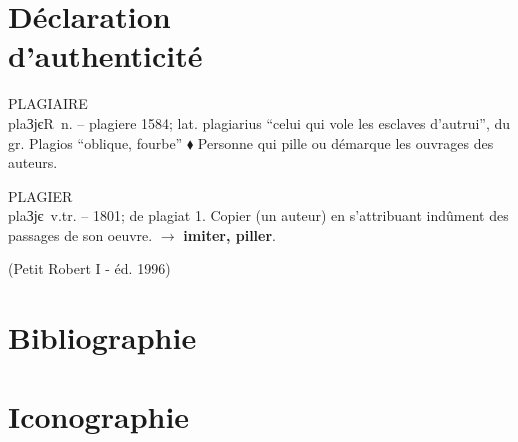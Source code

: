\chapter*{Déclaration\\\null\hspace*{4.3cm}d'authenticité}
\hspace*{4.5cm}
\begin{minipage}{\textwidth-4.5cm}
	\setlength{\parskip}{\currentparskip}
	\begin{mdframed}[
			linecolor=Grey,
			backgroundcolor=White,
			skipabove=0mm,
			skipbelow=0mm,
			innertopmargin=2mm,
			innerbottommargin=2mm,
			innerleftmargin=2mm,
			innerrightmargin=0mm,
			leftmargin=0mm,
			rightline=false,
			topline=false,
			bottomline=false,
			linewidth=1mm
		]
		PLAGIAIRE\\
		\lbrack plaЗјєR\rbrack\ n. -- plagiere 1584; lat. plagiarius \enquote{celui qui vole les esclaves d’autrui}, du gr. Plagios
		\enquote{oblique, fourbe} $\blacklozenge$ Personne qui pille ou démarque les ouvrages des auteurs.
		
		PLAGIER\\
		\lbrack plaЗјє\rbrack\ v.tr. -- 1801; de plagiat 1. Copier (un auteur) en s’attribuant indûment des passages de son
		oeuvre. $\rightarrow$ \textbf{imiter, piller}.
		
		\hfill (Petit Robert I - éd. 1996)
	\end{mdframed}
	
	\vspace*{1cm}
\end{minipage}



\chapter*{Bibliographie}
\sloppy
\hspace*{4.2cm}
\begin{minipage}{\textwidth-4.2cm}
	\printbibliography[notkeyword=image, heading=none]
\end{minipage}



\chapter*{Iconographie}

\hspace*{4.2cm}
\begin{minipage}{\textwidth-4.2cm}
	\printbibliography[keyword=image, heading=none]
\end{minipage}



%
%
%



